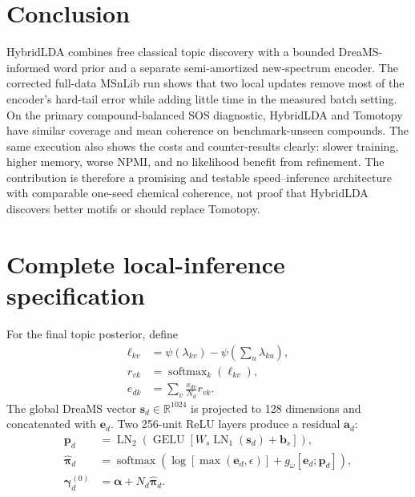 \documentclass[11pt]{article}
\begin{document}
\section{Conclusion}

HybridLDA combines free classical topic discovery with a bounded
DreaMS-informed word prior and a separate semi-amortized new-spectrum encoder.
The corrected full-data MSnLib run shows that two local updates remove most of
the encoder's hard-tail error while adding little time in the measured batch
setting. On the
primary compound-balanced SOS diagnostic, HybridLDA and Tomotopy have similar
coverage and mean coherence on benchmark-unseen compounds. The same execution
also shows the costs and counter-results clearly: slower training, higher
memory, worse NPMI, and no likelihood benefit from refinement. The contribution
is therefore a promising and testable speed--inference architecture with
comparable one-seed chemical coherence, not proof that HybridLDA discovers
better motifs or should replace Tomotopy.

\clearpage
\appendix

\section{Complete local-inference specification}
\label{app:inference}

For the final topic posterior, define
\begin{align}
 \ell_{kv} &= \psi(\lambda_{kv})-
 \psi\left(\sum_u\lambda_{ku}\right),\\
 r_{vk} &= \operatorname{softmax}_k(\ell_{kv}),\\
 e_{dk} &= \sum_v\frac{x_{dv}}{N_d}r_{vk}.
\end{align}
The global DreaMS vector $\mathbf s_d\in\mathbb R^{1024}$ is projected to 128
dimensions and concatenated with $\mathbf e_d$. Two 256-unit ReLU layers
produce a residual $\mathbf a_d$:
\begin{align}
 \mathbf p_d&=\operatorname{LN}_2\!\left(
 \operatorname{GELU}\left[W_s\operatorname{LN}_1(\mathbf s_d)+\mathbf b_s\right]
 \right),\\
 \widehat{\boldsymbol\pi}_d&=\operatorname{softmax}\left(
 \log[\max(\mathbf e_d,\epsilon)]+g_\omega[\mathbf e_d;\mathbf p_d]\right),\\
 \boldsymbol\gamma_d^{(0)}&=\boldsymbol\alpha+
 N_d\widehat{\boldsymbol\pi}_d.
\end{align}
\end{document}

